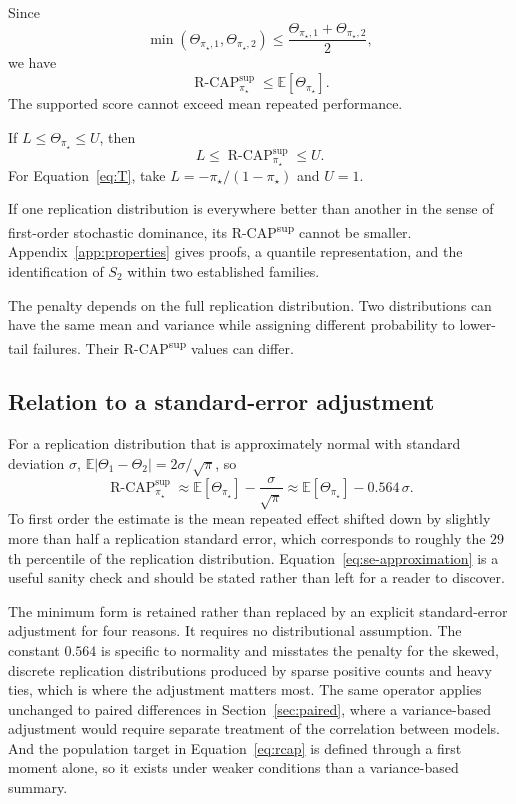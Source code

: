 \documentclass[11pt]{article}
\newcommand{\E}{\mathbb{E}}
\newcommand{\RCAP}{\operatorname{R\text{-}CAP}^{\mathrm{sup}}_{\pi_\star}}
\theoremstyle{remark}
\begin{document}
Since
\[
\min(\Theta_{\pi_\star,1},\Theta_{\pi_\star,2})
\leq
\frac{\Theta_{\pi_\star,1}+\Theta_{\pi_\star,2}}{2},
\]
we have
\[
\RCAP\leq\E[\Theta_{\pi_\star}].
\]
The supported score cannot exceed mean repeated performance.

If $L\leq\Theta_{\pi_\star}\leq U$, then
\[
L\leq\RCAP\leq U.
\]
For Equation~\eqref{eq:T}, take $L=-\pi_\star/(1-\pi_\star)$ and $U=1$.

If one replication distribution is everywhere better than another in the sense of first-order stochastic dominance, its R-CAP\textsuperscript{sup} cannot be smaller. Appendix~\ref{app:properties} gives proofs, a quantile representation, and the identification of $S_2$ within two established families.

The penalty depends on the full replication distribution. Two distributions can have the same mean and variance while assigning different probability to lower-tail failures. Their R-CAP\textsuperscript{sup} values can differ.

\subsection{Relation to a standard-error adjustment}

For a replication distribution that is approximately normal with standard deviation $\sigma$, $\E|\Theta_1-\Theta_2|=2\sigma/\sqrt{\pi}$, so
\begin{equation}
\RCAP
\approx
\E[\Theta_{\pi_\star}]-\frac{\sigma}{\sqrt{\pi}}
\approx
\E[\Theta_{\pi_\star}]-0.564\,\sigma .
\label{eq:se-approximation}
\end{equation}
To first order the estimate is the mean repeated effect shifted down by slightly more than half a replication standard error, which corresponds to roughly the $29$th percentile of the replication distribution. Equation~\eqref{eq:se-approximation} is a useful sanity check and should be stated rather than left for a reader to discover.

The minimum form is retained rather than replaced by an explicit standard-error adjustment for four reasons. It requires no distributional assumption. The constant $0.564$ is specific to normality and misstates the penalty for the skewed, discrete replication distributions produced by sparse positive counts and heavy ties, which is where the adjustment matters most. The same operator applies unchanged to paired differences in Section~\ref{sec:paired}, where a variance-based adjustment would require separate treatment of the correlation between models. And the population target in Equation~\eqref{eq:rcap} is defined through a first moment alone, so it exists under weaker conditions than a variance-based summary.
\end{document}
